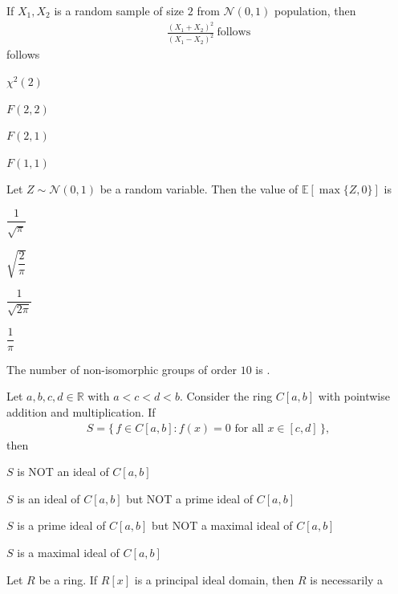 \documentclass[journal,12pt,onecolumn]{IEEEtran}
\theoremstyle{remark}
\begin{document}
\begin{enumerate}
{\item If $X_1,X_2$ is a random sample of size $2$ from $\mathcal{N}(0,1)$ population, then
\begin{align*}
\frac{(X_1+X_2)^{2}}{(X_1-X_2)^{2}}\ \text{follows}
\end{align*} follows

\hfill{}

\begin{enumerate}
\begin{multicols}{2}
\item $\chi^{2}(2)$
\item $F(2,2)$
\item $F(2,1)$
\item $F(1,1)$
\end{multicols}
\end{enumerate}


\item Let $Z\sim\mathcal{N}(0,1)$ be a random variable. Then the value of $\mathbb{E}\!\left[\max\{Z,0\}\right]$ is


\begin{enumerate}
\begin{multicols}{4}
\item $\dfrac{1}{\sqrt{\pi}}$
\item $\sqrt{\dfrac{2}{\pi}}$
\item $\dfrac{1}{\sqrt{2\pi}}$
\item $\dfrac{1}{\pi}$
\end{multicols}
\end{enumerate}

\item The number of non-isomorphic groups of order $10$ is
\underline{\hspace{2.5cm}}.

\hfill{}

\item Let $a,b,c,d\in\mathbb{R}$ with $a<c<d<b$. Consider the ring $C[a,b]$ with
pointwise addition and multiplication. If
\begin{align*}
S=\{\,f\in C[a,b]: f(x)=0 \text{ for all } x\in[c,d]\,\},
\end{align*}
then


\begin{enumerate}
\begin{multicols}{2}
\item $S$ is NOT an ideal of $C[a,b]$
\item $S$ is an ideal of $C[a,b]$ but NOT a prime ideal of $C[a,b]$
\item $S$ is a prime ideal of $C[a,b]$ but NOT a maximal ideal of $C[a,b]$
\item $S$ is a maximal ideal of $C[a,b]$
\end{multicols}
\end{enumerate}
\newpage
\item Let $R$ be a ring. If $R[x]$ is a principal ideal domain, then $R$ is necessarily a

}
\end{enumerate}
\end{document}
